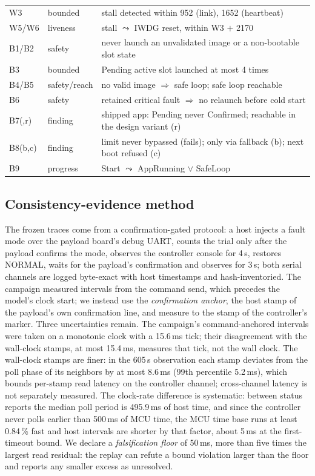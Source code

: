 \documentclass[conference,a4paper]{IEEEtran}
\newif\ifrerunmarks
\DeclareRobustCommand{\rerun}[1]{\ifrerunmarks\textcolor{red}{#1}\else#1\fi}
\begin{document}
\begin{table}[t]
\begin{tabularx}{\columnwidth}{@{}l l >{\raggedright\arraybackslash}X@{}}
W3 & bounded & stall detected within \rerun{952} (link), \rerun{1652} (heartbeat) \\
W5/W6 & liveness & stall $\leadsto$ IWDG reset, within W3 ${+}$ 2170 \\
B1/B2 & safety & never launch an unvalidated image or a non-bootable slot state \\
B3 & bounded & Pending active slot launched at most 4 times \\
B4/B5 & safety/reach & no valid image $\Rightarrow$ safe loop; safe loop reachable \\
B6 & safety & retained critical fault $\Rightarrow$ no relaunch before cold start \\
B7(,r) & finding & shipped app: Pending never Confirmed; reachable in the design variant (r) \\
B8(b,c) & finding & limit never bypassed (fails); only via fallback (b); next boot refused (c) \\
B9 & progress & Start $\leadsto$ AppRunning $\lor$ SafeLoop \\
\bottomrule
\end{tabularx}
\end{table}

\subsection{Consistency-evidence method}
\label{sec:confmethod}
The frozen traces come from a confirmation-gated protocol: a host injects a fault mode over the payload board's debug UART, counts the trial only after the payload confirms the mode, observes the controller console for 4\,s, restores NORMAL, waits for the payload's confirmation and observes for 3\,s; both serial channels are logged byte-exact with host timestamps and hash-inventoried. The campaign measured intervals from the command send, which precedes the model's clock start; we instead use the \emph{confirmation anchor}, the host stamp of the payload's own confirmation line, and measure to the stamp of the controller's marker. Three uncertainties remain. The campaign's command-anchored intervals were taken on a monotonic clock with a 15.6\,ms tick; their disagreement with the wall-clock stamps, at most 15.4\,ms, measures that tick, not the wall clock. The wall-clock stamps are finer: in the 605\,s observation each stamp deviates from the poll phase of its neighbors by at most 8.6\,ms (99th percentile 5.2\,ms), which bounds per-stamp read latency on the controller channel; cross-channel latency is not separately measured. The clock-rate difference is systematic: between status reports the median poll period is 495.9\,ms of host time, and since the controller never polls earlier than 500\,ms of MCU time, the MCU time base runs at least 0.84\,\% fast and host intervals are shorter by that factor, about 5\,ms at the first-timeout bound. We declare a \emph{falsification floor} of 50\,ms, more than five times the largest read residual: the replay can refute a bound violation larger than the floor and reports any smaller excess as unresolved.
\end{document}
